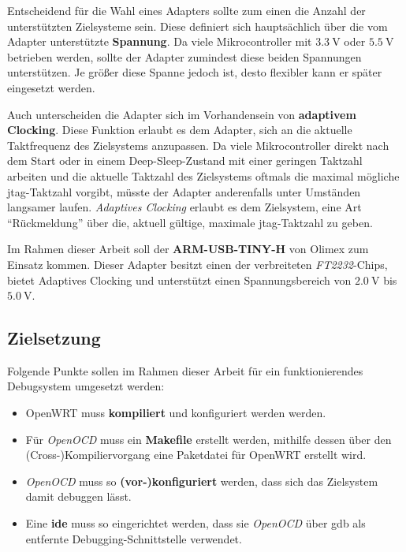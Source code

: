 Entscheidend für die Wahl eines Adapters sollte zum einen die Anzahl der
unterstützten Zielsysteme sein. Diese definiert sich hauptsächlich über die
vom Adapter unterstützte \textbf{Spannung}. Da viele Mikrocontroller mit
$\SI{3.3}{\volt}$ oder $\SI{5.5}{\volt}$ betrieben werden, sollte der Adapter
zumindest diese beiden Spannungen unterstützen. Je größer diese Spanne jedoch ist, desto flexibler kann
er später eingesetzt werden.

Auch unterscheiden die Adapter sich im Vorhandensein von \textbf{adaptivem
Clocking}. Diese Funktion erlaubt es dem Adapter, sich an die aktuelle
Taktfrequenz des Zielsystems anzupassen. Da viele Mikrocontroller direkt nach
dem Start oder in einem Deep-Sleep-Zustand mit einer geringen Taktzahl arbeiten
und die aktuelle Taktzahl des Zielsystems oftmals die maximal mögliche
\gls{jtag}-Taktzahl vorgibt, müsste der Adapter anderenfalls unter Umständen langsamer
laufen. \emph{Adaptives Clocking} erlaubt es dem Zielsystem, eine Art
"`Rückmeldung"' über die, aktuell gültige, maximale \gls{jtag}-Taktzahl zu geben.

Im Rahmen dieser Arbeit soll der \textbf{ARM-USB-TINY-H} von Olimex zum Einsatz
kommen.
Dieser Adapter besitzt einen der verbreiteten \emph{FT2232}-Chips, bietet
Adaptives Clocking und unterstützt einen Spannungsbereich von $\SI{2.0}{\volt}$
bis $\SI{5.0}{\volt}$.

\subsection{Zielsetzung}
Folgende Punkte sollen im Rahmen dieser Arbeit für ein funktionierendes
Debugsystem umgesetzt werden:
\begin{itemize}
  \item OpenWRT muss \textbf{kompiliert} und konfiguriert werden werden.
  \item Für \emph{OpenOCD} muss ein \textbf{Makefile} erstellt werden, mithilfe
  dessen über den \\(Cross-)Kompiliervorgang eine Paketdatei für
  OpenWRT erstellt wird.
  \item \emph{OpenOCD} muss so \textbf{(vor-)konfiguriert} werden, dass sich das
  Zielsystem damit debuggen lässt.
  \item Eine \textbf{\gls{ide}} muss so eingerichtet werden, dass sie \emph{OpenOCD}
  über \gls{gdb} als entfernte Debugging-Schnittstelle verwendet.
\end{itemize}
